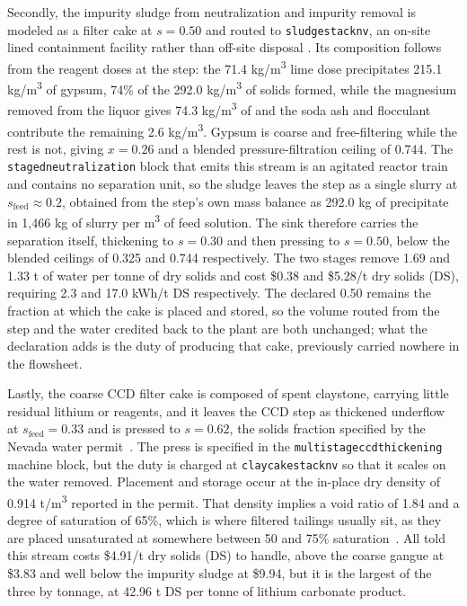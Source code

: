\documentclass{article}
\renewcommand\_{\textunderscore\allowbreak}
\begin{document}
Secondly, the impurity sludge from neutralization and impurity removal is modeled as a filter cake at $s = 0.50$ and routed to \texttt{sludge\_stack\_nv\_50}, an on-site lined containment facility rather than off-site disposal \cite{sgscanadaincSK1300Technical2024}. Its composition follows from the reagent doses at the step: the 71.4 \si{kg/m^3} lime dose precipitates 215.1 \si{kg/m^3} of gypsum, 74\% of the 292.0 \si{kg/m^3} of solids formed, while the magnesium removed from the liquor gives 74.3 \si{kg/m^3} of  and the soda ash and flocculant contribute the remaining 2.6 \si{kg/m^3}. Gypsum is coarse and free-filtering while the rest is not, giving $x = 0.26$ and a blended pressure-filtration ceiling of 0.744. The \texttt{staged\_neutralization} block that emits this stream is an agitated reactor train and contains no separation unit, so the sludge leaves the step as a single slurry at $s_{\text{feed}}\approx0.2$, obtained from the step's own mass balance as 292.0 kg of precipitate in 1,466 kg of slurry per \si{m^3} of feed solution. The sink therefore carries the separation itself, thickening to $s=0.30$ and then pressing to $s=0.50$, below the blended ceilings of 0.325 and 0.744 respectively. The two stages remove 1.69 and 1.33 t of water per tonne of dry solids and cost \$0.38 and \$5.28/t dry solids (DS), requiring 2.3 and 17.0 \si{kWh/t} DS respectively. The declared 0.50 remains the fraction at which the cake is placed and stored, so the volume routed from the step and the water credited back to the plant are both unchanged; what the declaration adds is the duty of producing that cake, previously carried nowhere in the flowsheet.

Lastly, the coarse CCD filter cake is composed of spent claystone, carrying little residual lithium or reagents, and it leaves the CCD step as thickened underflow at $s_{\text{feed}} = 0.33$ and is pressed to $s = 0.62$, the solids fraction specified by the Nevada water permit~\cite{lithiumnevadacorp.FactSheetThacker2022}. The press is specified in the \texttt{multi\_stage\_ccd\_thickening} machine block, but the duty is charged at \texttt{claycake\_stack\_nv\_62} so that it scales on the water removed. Placement and storage occur at the in-place dry density of 0.914 \si{t/m^3} reported in the permit. That density implies a void ratio of 1.84 and a degree of saturation of 65\%, which is where filtered tailings usually sit, as they are placed unsaturated at somewhere between 50 and 75\% saturation~\citep{crystalFilterPressedDryStacking2018}. All told this stream costs \$4.91/t dry solids (DS) to handle, above the coarse gangue at \$3.83 and well below the impurity sludge at \$9.94, but it is the largest of the three by tonnage, at 42.96 t DS per tonne of lithium carbonate product.
\end{document}

